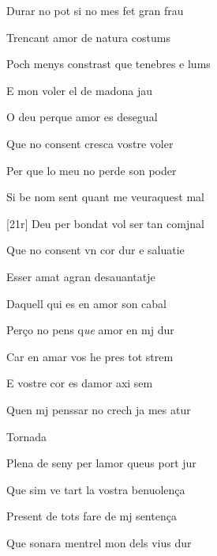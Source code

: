 \documentclass[12pt]{article}
\begin{document}
\begin{estrofa}

 Durar no pot si no mes fet gran frau

 Trencant amor de natura costums

 Poch menys constrast que tenebres e lums

 E mon voler el de madona jau

 O deu perque amor es desegual

 Que no consent cresca vostre voler

 Per que lo meu no perde son poder

 Si be nom sent quant me veuraquest mal

\end{estrofa}



\begin{estrofa}

 [21r] Deu per bondat vol ser tan comjnal

 Que no consent vn cor dur e saluatie

 Esser amat agran desauantatje

 Daquell qui es en amor son cabal

 Per\c{c}o no pens q\textit{ue} amor en mj dur

 Car en amar vos he pres tot strem

 E vostre cor es damor axi sem

 Quen mj penssar no crech ja mes atur

\end{estrofa}


\begin{estrofaExtra}%




\begin{tornada}

Tornada

\end{tornada}


\end{estrofaExtra}


\begin{estrofa}

 Plena de seny per lamor queus port jur

 Que sim ve tart la vostra benuolen\c{c}a

 Present de tots fare de mj senten\c{c}a

 Que sonara mentrel mon dels vius dur

\end{estrofa}
\end{document}
